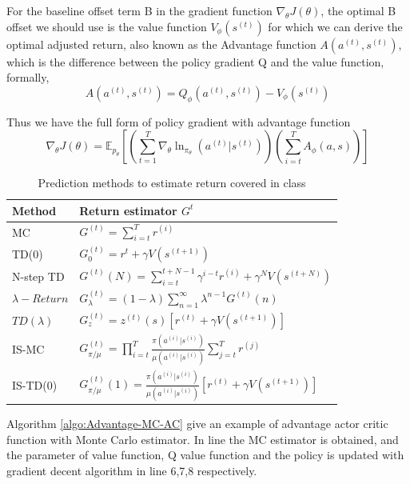 \documentclass[11pt]{article}
\begin{document}
For the baseline offset term B in the gradient function $\nabla_\theta J(\theta)$, the optimal B offset we should use is the value function $V_{\phi}(s^{(t)})$ for which we can derive the optimal adjusted return, also known as the Advantage function $A(a^{(t)},s^{(t)})$, which is the difference between the policy gradient Q and the value function, formally, 
$$A(a^{(t)},s^{(t)})=Q_{\phi}(a^{(t)},s^{(t)})-V_{\phi}(s^{(t)})$$

Thus we have the full form of policy gradient with advantage function 
$$\nabla_\theta  J(\theta)=\mathbb{E}_{p_\theta} \left[\left(\sum_{t=1}^{T}\nabla_{\theta}\ln_{\pi_ \theta}(a^{(t)}|s^{(t)})\right)\left( \sum_{i=t}^{T}A_{\phi}(a,s)\right)\right] $$

\begin{table}[]
\centering
\begin{tabular}{|l|l|}
\hline
Method & Return estimator $G^{t}$ \\ \hline
MC     & $G^{(t)}=\sum_{i=t}^{T}r^{(i)}$                 \\ \hline
TD(0)     & $G^{(t)}_{0}= r^{t}+ \gamma V(s^{(t+1)})$                 \\ \hline
N-step TD & $G^{(t)}(N)=\sum_{i=t}^{t+N-1} \gamma^{i-t}r^{(i)} + \gamma^N V(s^{(t+N)})$\\ \hline
$\lambda-Return$ & $G^{(t)}_{\lambda}=(1-\lambda) \sum_{n=1}^{\infty} \lambda^{n-1}G^{(t)}(n)$                 \\ \hline
$TD(\lambda)$ & $G^{(t)}_{z} =z^{(t)}(s)\left[r^{(t)}+\gamma V(s^{(t+1)})\right]$                 \\ \hline
IS-MC      & $G^{(t)}_{\pi/\mu} =\prod_{i=t}^{T} \frac{\pi(a^{(i)}|s^{(i)})}{\mu(a^{(i)}|s^{(i)})} \sum_{j=t}^{T}r^{(j)}$                 \\ \hline
IS-TD(0) & $G^{(t)}_{\pi/\mu}(1)=\frac{\pi(a^{(i)}|s^{(i)})}{\mu(a^{(i)}|s^{(i)})} \left[r^{(t)}+\gamma V(s^{(t+1)})\right]$                 \\ \hline
\end{tabular}
\label{Tab:func}
\caption{Prediction methods to estimate return covered in class}
\end{table}

Algorithm \ref{algo:Advantage-MC-AC} give an example of advantage actor critic function with Monte Carlo estimator. In line the MC  estimator is obtained, and the parameter of value function, Q value function and the policy is updated with gradient decent algorithm in line 6,7,8 respectively.
\end{document}

